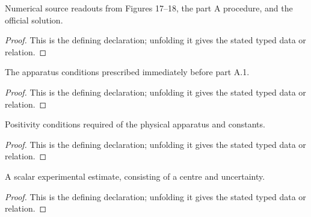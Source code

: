 \begin{definition}[SourceReadouts]
  \label{decl:physics:IPhO_2026_4_A_1:SourceReadouts}
  Numerical source readouts from Figures 17--18, the part A procedure, and the official solution.
\end{definition}
\begin{proof}
  This is the defining declaration; unfolding it gives the stated typed data or relation.
\end{proof}

\begin{definition}[ExperimentalConditions]
  \label{decl:physics:IPhO_2026_4_A_1:ExperimentalConditions}
  The apparatus conditions prescribed immediately before part A.1.
\end{definition}
\begin{proof}
  This is the defining declaration; unfolding it gives the stated typed data or relation.
\end{proof}

\begin{definition}[PhysicalAdmissibility]
  \label{decl:physics:IPhO_2026_4_A_1:PhysicalAdmissibility}
  Positivity conditions required of the physical apparatus and constants.
\end{definition}
\begin{proof}
  This is the defining declaration; unfolding it gives the stated typed data or relation.
\end{proof}

\begin{definition}[ScalarEstimate]
  \label{decl:physics:IPhO_2026_4_A_1:ScalarEstimate}
  A scalar experimental estimate, consisting of a centre and uncertainty.
\end{definition}
\begin{proof}
  This is the defining declaration; unfolding it gives the stated typed data or relation.
\end{proof}

